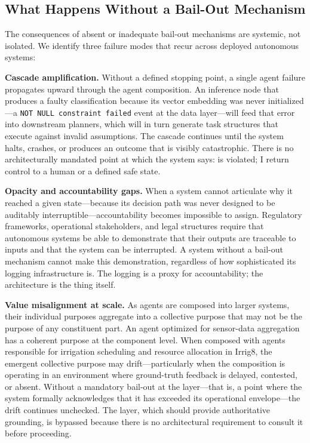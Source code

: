 \subsection*{What Happens Without a Bail-Out Mechanism}

The consequences of absent or inadequate bail-out mechanisms are systemic, not isolated. We identify three failure modes that recur across deployed autonomous systems:

\textbf{Cascade amplification.} Without a defined stopping point, a single agent failure propagates upward through the agent composition. An inference node that produces a faulty classification because its vector embedding was never initialized—a \texttt{NOT NULL constraint failed} event at the data layer—will feed that error into downstream planners, which will in turn generate task structures that execute against invalid assumptions. The cascade continues until the system halts, crashes, or produces an outcome that is visibly catastrophic. There is no architecturally mandated point at which the system says: \purpose is violated; I return control to a human or a defined safe state.

\textbf{Opacity and accountability gaps.} When a system cannot articulate why it reached a given state—because its decision path was never designed to be auditably interruptible—accountability becomes impossible to assign. Regulatory frameworks, operational stakeholders, and legal structures require that autonomous systems be able to demonstrate that their outputs are traceable to inputs and that the system can be interrupted. A system without a bail-out mechanism cannot make this demonstration, regardless of how sophisticated its logging infrastructure is. The logging is a proxy for accountability; the architecture is the thing itself.

\textbf{Value misalignment at scale.} As agents are composed into larger systems, their individual purposes aggregate into a collective purpose that may not be the purpose of any constituent part. An agent optimized for sensor-data aggregation has a coherent purpose at the component level. When composed with agents responsible for irrigation scheduling and resource allocation in Irrig8, the emergent collective purpose may drift—particularly when the composition is operating in an environment where ground-truth feedback is delayed, contested, or absent. Without a mandatory bail-out at the \bounds layer—that is, a point where the system formally acknowledges that it has exceeded its operational envelope—the drift continues unchecked. The \fact layer, which should provide authoritative grounding, is bypassed because there is no architectural requirement to consult it before proceeding.

